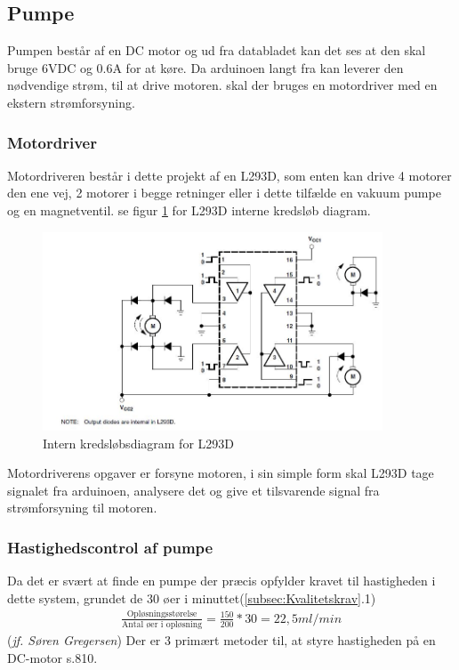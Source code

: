  \subsection{Pumpe}
 Pumpen består af en DC motor og ud fra databladet kan det ses at den skal bruge 6VDC og 0.6A for at køre. Da arduinoen langt fra kan leverer den nødvendige strøm, til at drive motoren. skal der bruges en motordriver med en ekstern strømforsyning.
 \subsubsection{Motordriver}
 Motordriveren består i dette projekt af en L293D, som enten kan drive 4 motorer den ene vej, 2 motorer i begge retninger eller i dette tilfælde en vakuum pumpe og en magnetventil. se figur \ref{fig:L293DInterndiagram} for L293D interne kredsløb diagram. 
   \begin{figure}[H]
	\centering
	\includegraphics[width=0.9\textwidth]{billeder/Hardware/diagrammer/L293intern.JPG}
	\caption{Intern kredsløbsdiagram for L293D}
	\label{fig:L293DInterndiagram}
\end{figure}
Motordriverens opgaver er forsyne motoren, i sin simple form skal L293D tage signalet fra arduinoen, analysere det og give et tilsvarende signal fra strømforsyning til motoren.
\subsubsection{Hastighedscontrol af pumpe}
Da det er svært at finde en pumpe der præcis opfylder kravet til hastigheden i dette system, grundet de 30 øer i minuttet(\ref{subsec:Kvalitetskrav}.1)
\begin{align}
\frac{\text{Opløsningsstørelse}}{\text{Antal øer i opløsning}} = \frac{150}{200}*30 = 22,5ml/min
\label{eg:ohastighed}
\end{align}(\textit{jf. Søren Gregersen})
Der er 3 primært metoder til, at styre hastigheden på en DC-motor \citep{ELengbog}s.810.

